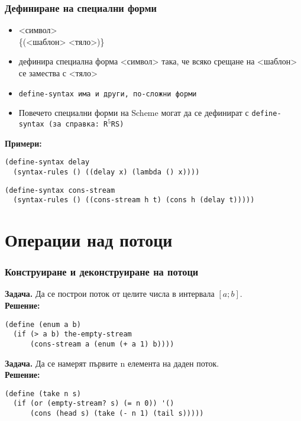 \documentclass[alsotrans]{beamerswitch}
\begin{document}
\begin{frame}[fragile]
  \frametitle{Дефиниране на специални форми}

  \begin{itemize}[<+->]
  \item {} <символ>\\
    \hspace{2.5em} \{\tta(<шаблон> <тяло>\tta)\}\tta{))}
  \item дефинира специална форма <символ> така, че всяко срещане на <шаблон> се замества с <тяло>
  \item \tt{define-syntax} има и други, по-сложни форми
  \item Повечето специални форми на Scheme могат да се дефинират с \tt{define-syntax} (за справка: R$^5$RS)
  \end{itemize}
  \onslide<+->
  \textbf{Примери:}
  \onslide<+->
\begin{lstlisting}
(define-syntax delay
  (syntax-rules () ((delay x) (lambda () x))))
\end{lstlisting}
  \onslide<+->
\begin{lstlisting}
(define-syntax cons-stream
  (syntax-rules () ((cons-stream h t) (cons h (delay t)))))
\end{lstlisting}
\end{frame}

\section{Операции над потоци}

\begin{frame}[fragile]
  \frametitle{Конструиране и деконструиране на потоци}

  \textbf{Задача.} Да се построи поток от целите числа в интервала $[a; b]$.\\
  \pause
  \textbf{Решение:}
\begin{lstlisting}
(define (enum a b)
  (if (> a b) the-empty-stream
      (cons-stream a (enum (+ a 1) b))))
\end{lstlisting}
  \pause
  \textbf{Задача.} Да се намерят първите n елемента на даден поток.\\
  \pause
  \textbf{Решение:}
\begin{lstlisting}
(define (take n s)
  (if (or (empty-stream? s) (= n 0)) '()
      (cons (head s) (take (- n 1) (tail s)))))
\end{lstlisting}
\end{frame}
\end{document}
